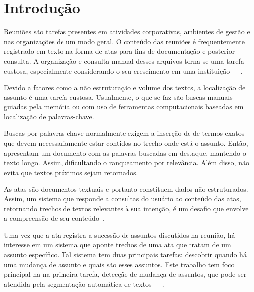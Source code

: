 

\section{Introdução}
	\label{sec:introducao}

Reuniões são tarefas presentes em atividades corporativas, ambientes de gestão e nas organizações de um modo geral. O conteúdo das reuniões é frequentemente registrado em texto na forma de atas para fins de documentação e posterior consulta. A organização e consulta manual desses arquivos torna-se uma tarefa custosa, especialmente considerando o seu crescimento em uma instituição~\cite{Lee2011}~\cite{Masakazu2013}~\cite{Miriam2013}. 


%
Devido a fatores como a não estruturação e volume dos textos, a localização de assunto é uma tarefa custosa. 
%
Usualmente, o que se faz são buscas manuais guiadas pela memória ou com uso de ferramentas computacionais baseadas em localização de palavras-chave.

%
Buscas por palavras-chave normalmente exigem a inserção de de termos exatos que devem necessariamente estar contidos no trecho onde está o assunto.
%
Então, apresentam um documento com as palavras buscadas em destaque, mantendo o texto longo. 
%
Assim, dificultando o ranqueamento por relevância. 
%
Além disso, não evita que textos próximos sejam retornados.

As atas são documentos textuais e portanto constituem dados não estruturados. Assim, um sistema que responde a consultas do usuário ao conteúdo das atas, retornando trechos de textos relevantes à sua intenção, é um desafio que envolve a compreensão de seu conteúdo~\cite{Bokaei2015}. 

Uma vez que a ata registra a sucessão de assuntos discutidos na reunião, há interesse em um sistema que aponte trechos de uma ata que tratam de um assunto específico. Tal sistema tem duas principais tarefas: descobrir quando há uma mudança de assunto e quais são esses assuntos. Este trabalho tem foco principal na na primeira tarefa, detecção de mudança de assuntos, que pode ser atendida pela segmentação automática de textos~\cite{Banerjee2006}~\cite{Beeferman1999}~\cite{Reynar1998}.



